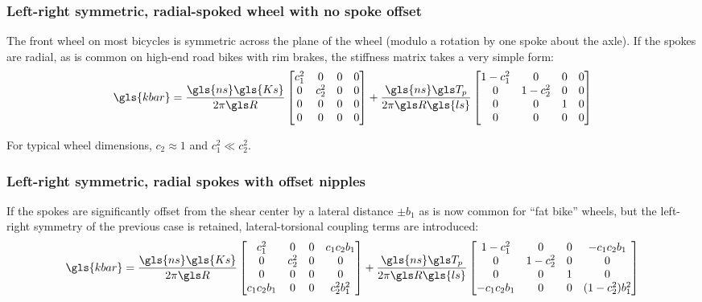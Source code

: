 \documentclass[\rootdir/thesis.tex]{subfiles}
\begin{document}
\subsubsection*{Left-right symmetric, radial-spoked wheel with no spoke offset}
The front wheel on most bicycles is symmetric across the plane of the wheel (modulo a rotation by one spoke about the axle). If the spokes are radial, as is common on high-end road bikes with rim brakes, the stiffness matrix takes a very simple form:
\begin{equation}
\label{eq:kbar_symm_radial}
\gls{kbar} = \frac{\gls{ns} \gls{Ks}}{2\pi \R}
\begin{bmatrix}
c_1^2     & 0 & 0 & 0\\
0 & c_2^2 & 0 & 0\\
0 & 0     & 0 & 0\\
0 & 0     & 0 & 0
\end{bmatrix} +
\frac{\gls{ns} \T_p}{2\pi \R \gls{ls}}
\begin{bmatrix}
1-c_1^2 & 0       & 0 & 0\\
0       & 1-c_2^2 & 0 & 0\\
0       & 0       & 1 & 0\\
0       & 0       & 0 & 0
\end{bmatrix}
\end{equation}

For typical wheel dimensions, $c_2 \approx 1$ and $c_1^2 \ll c_2^2$.

\subsubsection*{Left-right symmetric, radial spokes with offset nipples}

If the spokes are significantly offset from the shear center by a lateral distance $\pm b_1$ as is now common for ``fat bike'' wheels, but the left-right symmetry of the previous case is retained, lateral-torsional coupling terms are introduced:
\begin{equation}
\label{eq:kbar_symm_offset}
\gls{kbar} = \frac{\gls{ns} \gls{Ks}}{2\pi \R}
\begin{bmatrix}
c_1^2     & 0 & 0 & c_1c_2 b_1\\
0 & c_2^2 & 0 & 0\\
0 & 0     & 0 & 0\\
c_1c_2b_1 & 0     & 0 & c_2^2b_1^2
\end{bmatrix} +
\frac{\gls{ns} \T_p}{2\pi \R \gls{ls}}
\begin{bmatrix}
1-c_1^2    & 0       & 0 & -c_1c_2b_1\\
0          & 1-c_2^2 & 0 & 0\\
0          & 0       & 1 & 0\\
-c_1c_2b_1 & 0       & 0 & (1-c_2^2)b_1^2
\end{bmatrix}
\end{equation}
\end{document}
